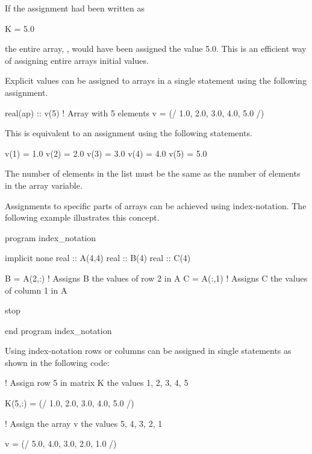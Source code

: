 If the assignment had been written as

\begin{fortrancodeenv}
K = 5.0
\end{fortrancodeenv}

the entire array, , would have been assigned the value 5.0. This is an efficient way of assigning entire arrays
initial values.

Explicit values can be assigned to arrays in a single statement using the following assignment.

\begin{fortrancodeenv}
real(ap) :: v(5) ! Array with 5 elements
v = (/ 1.0, 2.0, 3.0, 4.0, 5.0 /)
\end{fortrancodeenv}

This is equivalent to an assignment using the following statements.

\begin{fortrancodeenv}
v(1) = 1.0
v(2) = 2.0
v(3) = 3.0
v(4) = 4.0
v(5) = 5.0
\end{fortrancodeenv}

The number of elements in the list must be the same as the number of elements in the array variable.

Assignments to specific parts of arrays can be achieved using index-notation. The following example illustrates this concept.

\begin{fortrancodeenv}
program index_notation

    implicit none
    real :: A(4,4)
    real :: B(4)
    real :: C(4)

    B = A(2,:) ! Assigns B the values of row 2 in A
    C = A(:,1) ! Assigns C the values of column 1 in A

    stop

end program index_notation
\end{fortrancodeenv}

Using index-notation rows or columns can be assigned in single statements as shown in the following code:

\begin{fortrancodeenv}
! Assign row 5 in matrix K the values 1, 2, 3, 4, 5

K(5,:) = (/ 1.0, 2.0, 3.0, 4.0, 5.0 /)

! Assign the array v the values 5, 4, 3, 2, 1

v = (/ 5.0, 4.0, 3.0, 2.0, 1.0 /)
\end{fortrancodeenv}


